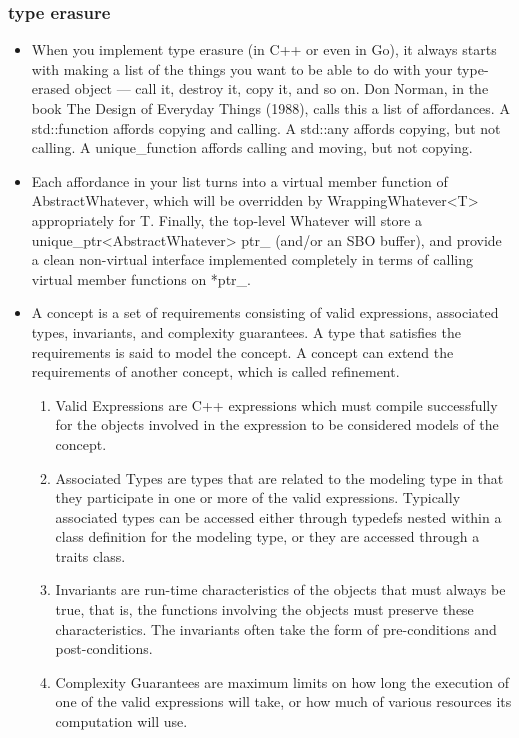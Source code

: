 \documentclass[a4paper,12pt,twoside]{book}
\begin{document}
\subsubsection{type erasure}
\begin{itemize}
\item When you implement type erasure (in C++ or even in Go), it always starts with making a list of the things you want to be able to do with your type-erased object — call it, destroy it, copy it, and so on. Don Norman, in the book The Design of Everyday Things (1988), calls this a list of affordances. A std::function affords copying and calling. A std::any affords copying, but not calling. A unique\_function affords calling and moving, but not copying.

\item Each affordance in your list turns into a virtual member function of AbstractWhatever, which will be overridden by WrappingWhatever<T> appropriately for T. Finally, the top-level Whatever will store a unique\_ptr<AbstractWhatever> ptr\_ (and/or an SBO buffer), and provide a clean non-virtual interface implemented completely in terms of calling virtual member functions on *ptr\_.

\item A concept is a set of requirements consisting of valid expressions, associated types, invariants, and complexity guarantees. A type that satisfies the requirements is said to model the concept. A concept can extend the requirements of another concept, which is called refinement.
\begin{enumerate}
	\item Valid Expressions are C++ expressions which must compile successfully for the objects involved in the expression to be considered models of the concept.

	\item Associated Types are types that are related to the modeling type in that they participate in one or more of the valid expressions. Typically associated types can be accessed either through typedefs nested within a class definition for the modeling type, or they are accessed through a traits class.

	\item Invariants are run-time characteristics of the objects that must always be true, that is, the functions involving the objects must preserve these characteristics. The invariants often take the form of pre-conditions and post-conditions.
	
	\item Complexity Guarantees are maximum limits on how long the execution of one of the valid expressions will take, or how much of various resources its computation will use.
\end{enumerate}
\end{itemize}
\end{document}
